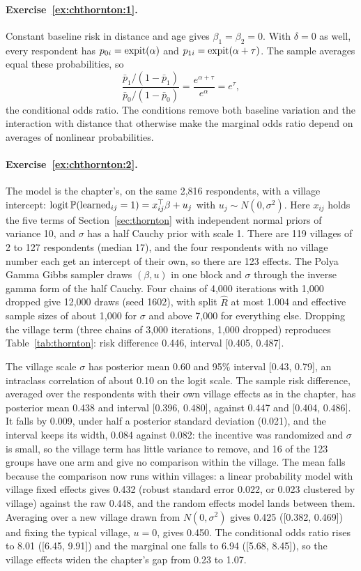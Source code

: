\paragraph{Exercise~\ref{ex:chthornton:1}.} Constant baseline risk in distance and age gives $\beta_1 = \beta_2 = 0$. With $\delta = 0$ as well, every respondent has $p_{0i} = \operatorname{expit}(\alpha)$ and $p_{1i} = \operatorname{expit}(\alpha + \tau)$. The sample averages equal these probabilities, so
\[
\frac{\bar p_1/(1 - \bar p_1)}{\bar p_0/(1 - \bar p_0)} = \frac{e^{\alpha + \tau}}{e^\alpha} = e^\tau,
\]
the conditional odds ratio. The conditions remove both baseline variation and the interaction with distance that otherwise make the marginal odds ratio depend on averages of nonlinear probabilities.

\paragraph{Exercise~\ref{ex:chthornton:2}.} The model is the chapter's, on the same 2,816 respondents, with a village intercept: $\operatorname{logit}\mathbb{P}(\text{learned}_{ij} = 1) = x_{ij}^\top\beta + u_j$ with $u_j \sim N(0, \sigma^2)$. Here $x_{ij}$ holds the five terms of Section~\ref{sec:thornton} with independent normal priors of variance 10, and $\sigma$ has a half Cauchy prior with scale 1. There are 119 villages of 2 to 127 respondents (median 17), and the four respondents with no village number each get an intercept of their own, so there are 123 effects. The Polya Gamma Gibbs sampler draws $(\beta, u)$ in one block and $\sigma$ through the inverse gamma form of the half Cauchy. Four chains of 4,000 iterations with 1,000 dropped give 12,000 draws (seed 1602), with split $\hat R$ at most 1.004 and effective sample sizes of about 1,000 for $\sigma$ and above 7,000 for everything else. Dropping the village term (three chains of 3,000 iterations, 1,000 dropped) reproduces Table~\ref{tab:thornton}: risk difference 0.446, interval [0.405, 0.487].

The village scale $\sigma$ has posterior mean 0.60 and 95\% interval [0.43, 0.79], an intraclass correlation of about 0.10 on the logit scale. The sample risk difference, averaged over the respondents with their own village effects as in the chapter, has posterior mean 0.438 and interval [0.396, 0.480], against 0.447 and [0.404, 0.486]. It falls by 0.009, under half a posterior standard deviation (0.021), and the interval keeps its width, 0.084 against 0.082: the incentive was randomized and $\sigma$ is small, so the village term has little variance to remove, and 16 of the 123 groups have one arm and give no comparison within the village. The mean falls because the comparison now runs within villages: a linear probability model with village fixed effects gives 0.432 (robust standard error 0.022, or 0.023 clustered by village) against the raw 0.448, and the random effects model lands between them. Averaging over a new village drawn from $N(0, \sigma^2)$ gives 0.425 ([0.382, 0.469]) and fixing the typical village, $u = 0$, gives 0.450. The conditional odds ratio rises to 8.01 ([6.45, 9.91]) and the marginal one falls to 6.94 ([5.68, 8.45]), so the village effects widen the chapter's gap from 0.23 to 1.07.

